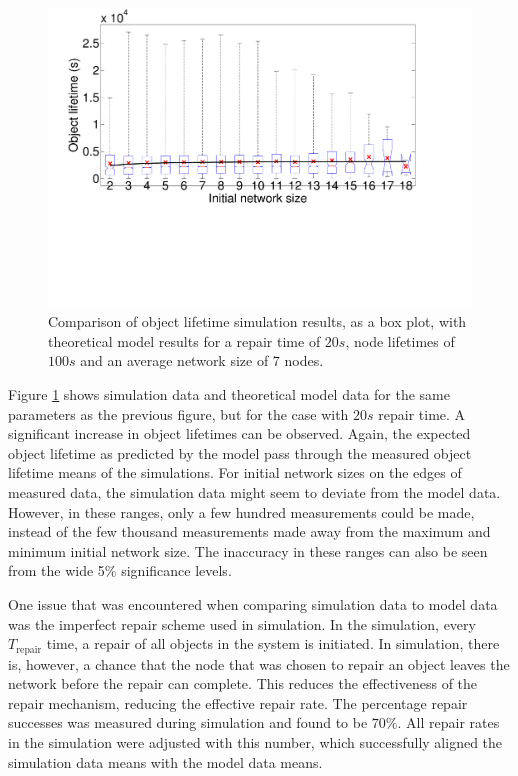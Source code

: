\documentclass[10pt,a4paper,conference]{IEEEtran}
\begin{document}
\begin{figure}[htbp]
 \centering
 \includegraphics[clip=true, viewport=1.2cm 7.0cm 26.0cm 21cm, width=\columnwidth]{lifetime_simulation_model_20_100}
 \caption{Comparison of object lifetime simulation results, as a box plot, with theoretical model results for a repair time of $20 s$, node lifetimes of $100 s$ and an average network size of 7 nodes.}
 \label{fig_lifetime_simulation_model_20_100}
\end{figure}
%
Figure \ref{fig_lifetime_simulation_model_20_100} shows simulation data and theoretical model data for the same parameters as the previous figure, but for the case with $20 s$ repair time. A significant increase in object lifetimes can be observed. Again, the expected object lifetime as predicted by the model pass through the measured object lifetime means of the simulations. For initial network sizes on the edges of measured data, the simulation data might seem to deviate from the model data. However, in these ranges, only a few hundred measurements could be made, instead of the few thousand measurements made away from the maximum and minimum initial network size. The inaccuracy in these ranges can also be seen from the wide 5\% significance levels.

One issue that was encountered when comparing simulation data to model data was the imperfect repair scheme used in simulation. In the simulation, every $T_{\textrm{repair}}$ time, a repair of all objects in the system is initiated. In simulation, there is, however, a chance that the node that was chosen to repair an object leaves the network before the repair can complete. This reduces the effectiveness of the repair mechanism, reducing the effective repair rate. The percentage repair successes was measured during simulation and found to be $70 \%$. All repair rates in the simulation were adjusted with this number, which successfully aligned the simulation data means with the model data means.
\end{document}
